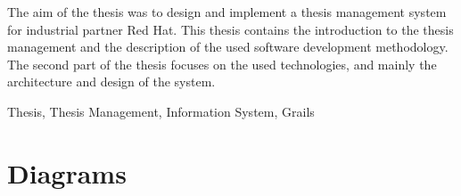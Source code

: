 \documentclass[11pt,oneside]{fithesis2}
\begin{document}
\FrontMatter
\ThesisTitlePage

\begin{ThesisDeclaration}		
\DeclarationText
\end{ThesisDeclaration}

\begin{ThesisAbstract}
The aim of the thesis was to design and implement a thesis management system for industrial partner Red Hat. This thesis contains the introduction to the thesis management and the description of the used software development methodology. The second part of the thesis focuses on the used technologies, and mainly the architecture and design of the system.
\end{ThesisAbstract}

\begin{ThesisKeyWords}
    Thesis, Thesis Management, Information System, Grails
\end{ThesisKeyWords}

\MainMatter

\tableofcontents












\appendix

\chapter{Diagrams}
\end{document}
